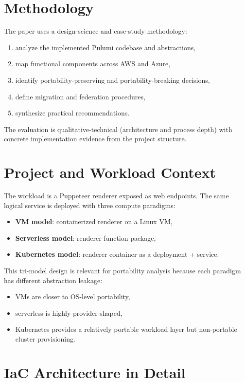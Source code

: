 \documentclass[conference]{IEEEtran}
\begin{document}
\section{Methodology}
The paper uses a design-science and case-study methodology:
\begin{enumerate}
    \item analyze the implemented Pulumi codebase and abstractions,
    \item map functional components across AWS and Azure,
    \item identify portability-preserving and portability-breaking decisions,
    \item define migration and federation procedures,
    \item synthesize practical recommendations.
\end{enumerate}

The evaluation is qualitative-technical (architecture and process depth) with concrete implementation evidence from the project structure.

\section{Project and Workload Context}
The workload is a Puppeteer renderer exposed as web endpoints. The same logical service is deployed with three compute paradigms:
\begin{itemize}
    \item \textbf{VM model}: containerized renderer on a Linux VM,
    \item \textbf{Serverless model}: renderer function package,
    \item \textbf{Kubernetes model}: renderer container as a deployment + service.
\end{itemize}

This tri-model design is relevant for portability analysis because each paradigm has different abstraction leakage:
\begin{itemize}
    \item VMs are closer to OS-level portability,
    \item serverless is highly provider-shaped,
    \item Kubernetes provides a relatively portable workload layer but non-portable cluster provisioning.
\end{itemize}

\section{IaC Architecture in Detail}
\end{document}
